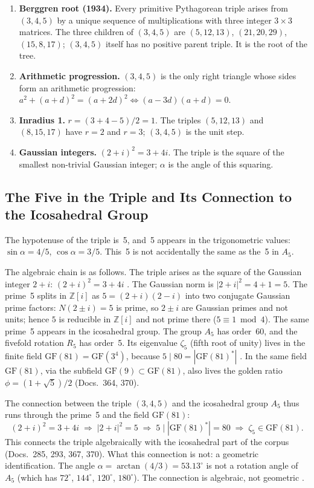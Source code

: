 \begin{enumerate}
\item \textbf{Berggren root (1934).} Every primitive Pythagorean triple arises
  from $(3,4,5)$ by a unique sequence of multiplications with three integer
  $3\times3$ matrices. The three children of $(3,4,5)$ are $(5,12,13)$,
  $(21,20,29)$, $(15,8,17)$; $(3,4,5)$ itself has no positive parent triple.
  It is the root of the tree.
\item \textbf{Arithmetic progression.} $(3,4,5)$ is the only right triangle
  whose sides form an arithmetic progression:
  $a^2+(a+d)^2=(a+2d)^2 \Leftrightarrow (a-3d)(a+d)=0$.
\item \textbf{Inradius 1.} $r = (3+4-5)/2 = 1$. The triples $(5,12,13)$ and
  $(8,15,17)$ have $r=2$ and $r=3$; $(3,4,5)$ is the unit step.
\item \textbf{Gaussian integers.} $(2+i)^2 = 3+4i$. The triple is the square
  of the smallest non-trivial Gaussian integer; $\alpha$ is the angle of this
  squaring.
\end{enumerate}

\subsection{The Five in the Triple and Its Connection to the Icosahedral Group \SM}

The hypotenuse of the triple is~5, and~5 appears in the trigonometric
values: $\sin\alpha = 4/5$, $\cos\alpha = 3/5$. This~5 is not accidentally
the same as the~5 in $A_5$.

The algebraic chain is as follows. The triple arises as the square of the
Gaussian integer $2+i$: $(2+i)^2 = 3+4i$ \BM. The Gaussian norm is
$|2+i|^2 = 4+1 = 5$. The prime~5 splits in $\mathbb Z[i]$ as
$5 = (2+i)(2-i)$ into two conjugate Gaussian prime factors:
$N(2\pm i)=5$ is prime, so $2\pm i$ are Gaussian primes and not units; hence
$5$ is reducible in $\mathbb Z[i]$ and not prime there ($5\equiv1\bmod4$).
The same prime~5
appears in the icosahedral group. The group $A_5$ has order~60, and the
fivefold rotation $R_5$ has order~5. Its eigenvalue $\zeta_5$ (fifth root of
unity) lives in the finite field $\mathrm{GF}(81) = \mathrm{GF}(3^4)$, because
$5 \mid 80 = |\mathrm{GF}(81)^*|$ \BM. In the same field $\mathrm{GF}(81)$,
via the subfield $\mathrm{GF}(9) \subset \mathrm{GF}(81)$, also lives the
golden ratio $\phi = (1+\sqrt5)/2$ (Docs.~364, 370).

The connection between the triple $(3,4,5)$ and the icosahedral group $A_5$
thus runs through the prime~5 and the field $\mathrm{GF}(81)$:
\[
  (2+i)^2 = 3+4i \;\Longrightarrow\; |2+i|^2 = 5 \;\Longrightarrow\;
  5 \mid |\mathrm{GF}(81)^*| = 80 \;\Longrightarrow\; \zeta_5 \in \mathrm{GF}(81).
\]
This connects the triple algebraically with the icosahedral part of the corpus
(Docs.~285, 293, 367, 370). What this connection is not: a geometric
identification. The angle $\alpha = \arctan(4/3) = 53.13^\circ$ is not a
rotation angle of $A_5$ (which has $72^\circ$, $144^\circ$, $120^\circ$,
$180^\circ$). The connection is algebraic, not geometric \SM.

